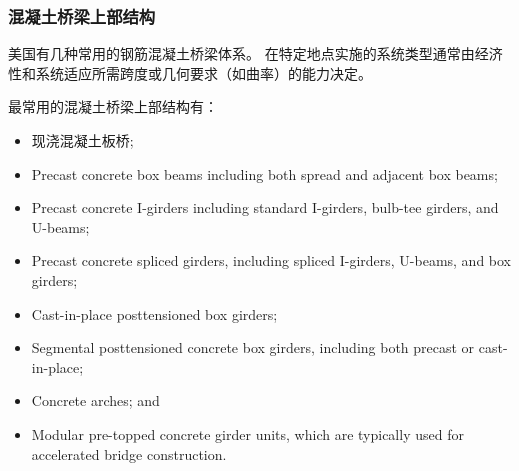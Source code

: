 \subsubsection{混凝土桥梁上部结构}

美国有几种常用的钢筋混凝土桥梁体系。 在特定地点实施的系统类型通常由经济性和系统适应所需跨度或几何要求（如曲率）的能力决定。

最常用的混凝土桥梁上部结构有：

\begin{itemize}
  \item 现浇混凝土板桥;
  \item Precast concrete box beams including both spread and adjacent box beams;
  \item Precast concrete I-girders including standard I-girders, bulb-tee girders, and U-beams;
  \item Precast concrete spliced girders, including spliced I-girders, U-beams, and box girders;
  \item Cast-in-place posttensioned box girders;
  \item Segmental posttensioned concrete box girders, including both precast or cast-in-place;
  \item Concrete arches; and
  \item Modular pre-topped concrete girder units, which are typically used for accelerated bridge construction.
\end{itemize}

